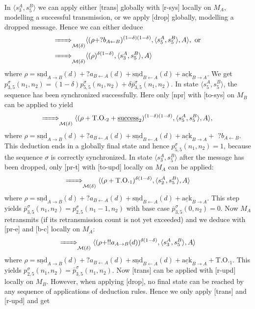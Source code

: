 \documentclass{sig-alternate}
\renewcommand{\d}{\delta}
\newcommand{\timeout}{\mathrm{T.O.}}
\newcommand{\locev}[1]{\underline{#1}}
\newcommand{\success}{\locev{\mathrm{success}}}
\newcommand{\snd}{\mathrm{snd}}
\newcommand{\ack}{\mathrm{ack}}
\newcommand{\env}[4]{\locev{#1}_{{#2} \rightarrow {#3}}(#4)}
\newcommand{\eenv}[3]{\locev{#1}_{{#2} \rightarrow {#3}}}
\newcommand{\sys}[4]{\locev{#1}_{{#2} \leftarrow {#3}}(#4)}
\begin{document}
In $\langle s^A_3, s^B_5 \rangle$ we can apply either [trans] globally with [r-sys] locally on $M_A$, modelling a successful transmission, or we apply [drop] globally, modelling a dropped message. Hence we can either deduce
\begin{align*}
	\bigstep{} &\langle (\rho + ?b_{A \leftarrow B})^{(1 - \d)(1 - \d)}, \langle s^A_5, s^B_5 \rangle, A \rangle,~\text{or}\\
	\bigstep{} &\langle (\rho)^{\d(1 - \d)}, \langle s^A_3, s^B_5 \rangle, A \rangle
\end{align*}
where $\rho = \env{\snd}{A}{B}{d} + ?a_{B \leftarrow A}(d) + \sys{\snd}{B}{A}{d} + \eenv{\ack}{B}{A}$. We get $p^{\sigma}_{3, 5}(n_1, n_2) = (1-\d)p^{\sigma}_{5, 5}(n_1, n_2) + \d \overline{p}^{\sigma}_{3, 5}(n_1, n_2)$. In state $\langle s^A_5, s^B_5 \rangle$, the sequence has been synchronized successfully. Here only [npr] with [to-sys] on $M_B$ can be applied to yield
\begin{equation*}
	\bigstep{} \langle (\rho + \timeout_2 + \success_2)^{(1 - \d)(1 - \d)}, \langle s^A_5, s^B_5 \rangle, A \rangle,\\
\end{equation*}
where $\rho =\env{\snd}{A}{B}{d} + ?a_{B \leftarrow A}(d) + \sys{\snd}{B}{A}{d} + \eenv{\ack}{B}{A} + $ $?b_{A \leftarrow B}$. This deduction ends in a globally final state and hence $p^{\sigma}_{5, 5}(n_1, n_2) = 1$, because the sequence $\sigma$ is correctly synchronized. In state $\langle s^A_3, s^B_5 \rangle$ after the message has been dropped, only [pr-t] with [to-upd] locally on $M_A$ can be applied:
\begin{equation*}
	\bigstep{} \langle (\rho + \timeout_1)^{\d(1 - \d)}, \langle s^A_2, s^B_5 \rangle, A \rangle
\end{equation*}
where $\rho = \env{\snd}{A}{B}{d} + ?a_{B \leftarrow A}(d) + \sys{\snd}{B}{A}{d} + \eenv{\ack}{B}{A}$. This step yields $\overline{p}^{\sigma}_{3, 5}(n_1, n_2) = p^{\sigma}_{2, 5}(n_1 - 1, n_2)$ with base case $\overline{p}^{\sigma}_{3, 5}(0, n_2) = 0$. Now $M_A$ retransmits (if its retransmission count is not yet exceeded) and we deduce with [pr-e] and [b-c] locally on $M_A$:
\begin{equation*}
	\bigstep{} \langle (\rho + !!a_{A \rightarrow B}(d))^{\d(1 - \d)}, \langle s^A_3, s^B_5 \rangle, A \rangle
\end{equation*}
where $\rho = \env{\snd}{A}{B}{d} + ?a_{B \leftarrow A}(d) + \sys{\snd}{B}{A}{d} + \eenv{\ack}{B}{A} + \timeout_1$. This yields $p^{\sigma}_{2, 5}(n_1, n_2) = \overline{\overline{p}}^{\sigma}_{3, 5}(n_1, n_2)$. Now [trans] can be applied with [r-upd] locally on $M_B$. However, when applying [drop], no final state can be reached by any sequence of applications of deduction rules. Hence we only apply [trans] and [r-upd] and get
\end{document}
